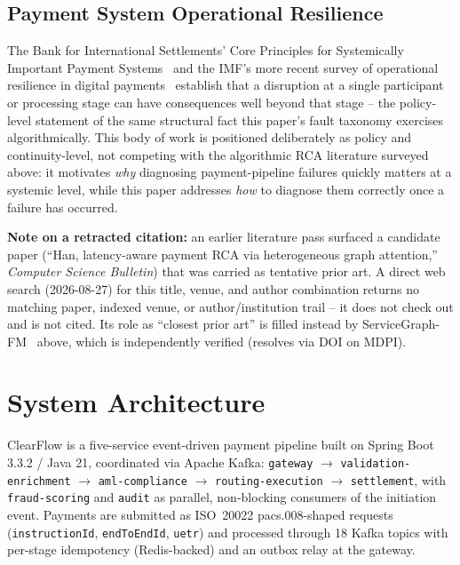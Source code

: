 \documentclass[conference]{IEEEtran}
\begin{document}
\subsection{Payment System Operational Resilience}
The Bank for International Settlements' Core Principles for Systemically
Important Payment Systems~\cite{bis2001cpss} and the IMF's more recent
survey of operational resilience in digital
payments~\cite{imf2021resilience} establish that a disruption at a single
participant or processing stage can have consequences well beyond that
stage -- the policy-level statement of the same structural fact this
paper's fault taxonomy exercises algorithmically. This body of work is positioned deliberately as policy and
continuity-level, not competing with the algorithmic RCA literature
surveyed above: it motivates \emph{why} diagnosing payment-pipeline
failures quickly matters at a systemic level, while this paper addresses
\emph{how} to diagnose them correctly once a failure has occurred.

\textbf{Note on a retracted citation:} an earlier literature pass surfaced a
candidate paper (``Han, latency-aware payment RCA via heterogeneous graph
attention,'' \emph{Computer Science Bulletin}) that was carried as
tentative prior art. A direct web search (2026-08-27) for this title,
venue, and author combination returns no matching paper, indexed venue, or
author/institution trail -- it does not check out and is not cited. Its
role as ``closest prior art'' is filled instead by
ServiceGraph-FM~\cite{servicegraphfm2026} above, which is independently
verified (resolves via DOI on MDPI).

\section{System Architecture}
\label{sec:system}

ClearFlow is a five-service event-driven payment pipeline built on Spring
Boot 3.3.2 / Java 21, coordinated via Apache Kafka:
\texttt{gateway} $\rightarrow$ \texttt{validation-enrichment} $\rightarrow$
\texttt{aml-compliance} $\rightarrow$ \texttt{routing-execution}
$\rightarrow$ \texttt{settlement}, with \texttt{fraud-scoring} and
\texttt{audit} as parallel, non-blocking consumers of the initiation event.
Payments are submitted as ISO~20022 pacs.008-shaped requests
(\texttt{instructionId}, \texttt{endToEndId}, \texttt{uetr}) and processed
through 18 Kafka topics with per-stage idempotency (Redis-backed) and an
outbox relay at the gateway.
\end{document}
